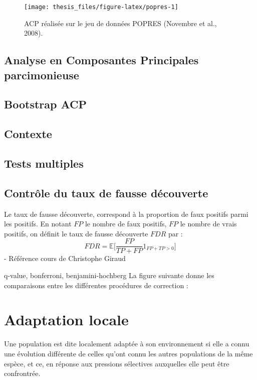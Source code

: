 \documentclass[12pt,twoside]{ugathesis}
\begin{document}
\begin{figure}

{\centering \texttt{[image: thesis\_files/figure-latex/popres-1]} 

}

\caption{ACP réalisée sur le jeu de données POPRES (Novembre et
al., 2008).}\label{fig:popres}
\end{figure}
\section{Analyse en Composantes Principales
parcimonieuse}\label{analyse-en-composantes-principales-parcimonieuse}

\section{Bootstrap ACP}\label{bootstrap-acp}

\section{Contexte}\label{contexte}

\section{Tests multiples}\label{tests-multiples}

\section{Contrôle du taux de fausse
découverte}\label{controle-du-taux-de-fausse-decouverte}

Le taux de fausse découverte, correspond à la proportion de faux
positifs parmi les positifs. En notant \(FP\) le nombre de faux
positifs, \(FP\) le nombre de vrais positifs, on définit le taux de
fausse découverte \(FDR\) par :
\[ FDR = \mathbb{E}\Big[\frac{FP}{TP + FP} 1_{FP+TP > 0}\Big] \] -
Référence cours de Christophe Giraud

q-value, bonferroni, benjamini-hochberg La figure suivante donne les
comparaisons entre les différentes procédures de correction :

\chapter{Adaptation locale}\label{adaptation-locale-1}

Une population est dite localement adaptée à son environnement si elle a
connu une évolution différente de celles qu'ont connu les autres
populations de la même espèce, et ce, en réponse aux pressions
sélectives auxquelles elle peut être confrontrée.
\end{document}

